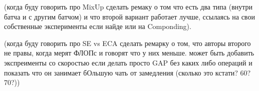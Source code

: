 
(когда буду говорить про MixUp сделать ремаку о том что есть два типа (внутри батча и с другим батчом) и что второй вариант работает лучше, ссылаясь на свои собственные эксперименты если найде или на Componding). 


(когда буду говорить про SE vs ECA сделать ремарку о том, что авторы второго не правы, когда мерят ФЛОПс и говорят что у них меньше. может быть добавить экспреименты со скоростью если делать просто GAP без каких либо операций и показать что он занимает бОльшую чать от замедления (сколько это кстати? 60? 70?))








